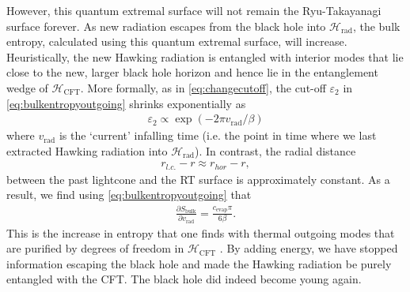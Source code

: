 \documentclass[11pt,a4paper]{article}
\begin{document}
However, this quantum extremal surface will not remain the Ryu-Takayanagi surface forever. As new radiation escapes from the black hole into $\mathcal{H}_\text{rad}$, the bulk entropy, calculated using this quantum extremal surface, will increase. Heuristically, the new Hawking radiation is entangled with interior modes that lie close to the new, larger black hole horizon and hence lie in the entanglement wedge of $\mathcal{H}_\text{CFT}$. More formally, as in \eqref{eq:changecutoff}, the cut-off $\varepsilon_2$ in \eqref{eq:bulkentropyoutgoing} shrinks exponentially as
\begin{align}
\varepsilon_2 \propto \exp(-2 \pi v_\text{rad} / \beta)
\end{align}
where $v_\text{rad}$ is the `current' infalling time  (i.e. the point in time where we last extracted Hawking radiation into $\mathcal{H}_\text{rad}$). In contrast, the radial distance
\begin{align}
r_{l.c.} - r \approx r_{hor} - r,
\end{align}
between the past lightcone and the RT surface is approximately constant. As a result, we find using \eqref{eq:bulkentropyoutgoing} that
\begin{align}
\frac{\partial S_\text{bulk}}{\partial v_\text{rad}} = \frac{c_\text{evap} \pi}{6 \beta}.
\end{align}
This is the increase in entropy that one finds with thermal outgoing modes that are purified by degrees of freedom in $\mathcal{H}_\text{CFT}$ \cite{calabrese2004entanglement, calabrese2009entanglement}. By adding energy, we have stopped information escaping the black hole and made the Hawking radiation be purely entangled with the CFT. The black hole did indeed become young again.
\end{document}
